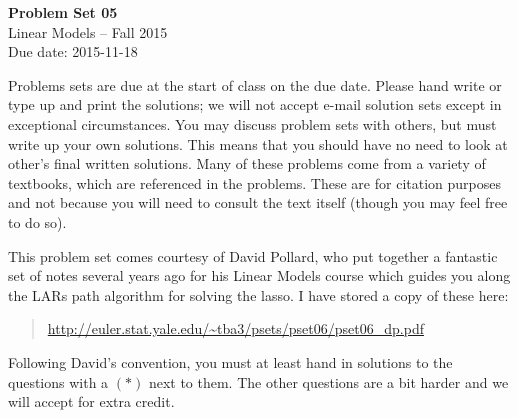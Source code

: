 \documentclass[12pt]{article}
\begin{document}
\begin{center}
{\bf Problem Set 05} \\
Linear Models -- Fall 2015 \\
Due date: 2015-11-18
\end{center}

\medskip

Problems sets are due at the start of class on the due date. Please hand write
or type up and print the solutions; we will not accept e-mail solution sets except
in exceptional circumstances. You may discuss problem sets with others, but must
write up your own solutions. This means that you should have no need to look at other's
final written solutions. Many of these problems come from a variety of textbooks,
which are referenced in the problems. These are for citation purposes and not because
you will need to consult the text itself (though you may feel free to do so).

\medskip

This problem set comes courtesy of David Pollard, who put together a fantastic
set of notes several years ago for his Linear Models course which guides you
along the LARs path algorithm for solving the lasso. I have stored a copy
of these here:
\begin{quote}
\url{http://euler.stat.yale.edu/~tba3/psets/pset06/pset06_dp.pdf}
\end{quote}
Following David's convention, you must at least hand in solutions to the questions
with a $(*)$ next to them. The other questions are a bit harder and we will accept
for extra credit.
\end{document}

